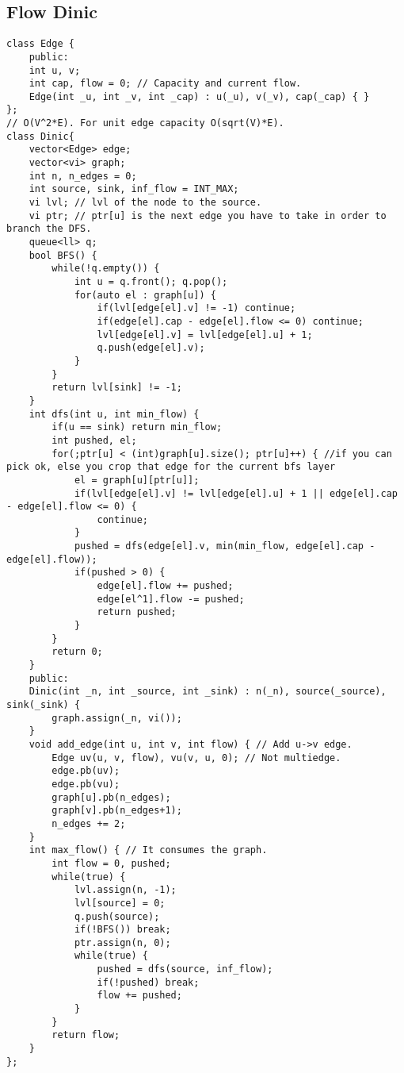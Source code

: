 \documentclass[a4paper]{article}
\begin{document}
\subsection*{Flow Dinic}
\begin{verbatim}
class Edge {
    public:
    int u, v;
    int cap, flow = 0; // Capacity and current flow.
    Edge(int _u, int _v, int _cap) : u(_u), v(_v), cap(_cap) { }
};
// O(V^2*E). For unit edge capacity O(sqrt(V)*E).
class Dinic{
    vector<Edge> edge;
    vector<vi> graph;
    int n, n_edges = 0;
    int source, sink, inf_flow = INT_MAX;
    vi lvl; // lvl of the node to the source.
    vi ptr; // ptr[u] is the next edge you have to take in order to branch the DFS.
    queue<ll> q;
    bool BFS() {
        while(!q.empty()) {
            int u = q.front(); q.pop();
            for(auto el : graph[u]) {
                if(lvl[edge[el].v] != -1) continue;
                if(edge[el].cap - edge[el].flow <= 0) continue;
                lvl[edge[el].v] = lvl[edge[el].u] + 1;
                q.push(edge[el].v);
            }
        }
        return lvl[sink] != -1;
    }
    int dfs(int u, int min_flow) {
        if(u == sink) return min_flow;
        int pushed, el;
        for(;ptr[u] < (int)graph[u].size(); ptr[u]++) { //if you can pick ok, else you crop that edge for the current bfs layer
            el = graph[u][ptr[u]];
            if(lvl[edge[el].v] != lvl[edge[el].u] + 1 || edge[el].cap - edge[el].flow <= 0) {
                continue;
            }
            pushed = dfs(edge[el].v, min(min_flow, edge[el].cap - edge[el].flow));
            if(pushed > 0) {
                edge[el].flow += pushed;
                edge[el^1].flow -= pushed;
                return pushed;
            }
        }
        return 0;
    }
    public:
    Dinic(int _n, int _source, int _sink) : n(_n), source(_source), sink(_sink) {
        graph.assign(_n, vi());
    }
    void add_edge(int u, int v, int flow) { // Add u->v edge.
        Edge uv(u, v, flow), vu(v, u, 0); // Not multiedge.
        edge.pb(uv);
        edge.pb(vu);
        graph[u].pb(n_edges);
        graph[v].pb(n_edges+1);
        n_edges += 2;
    }
    int max_flow() { // It consumes the graph.
        int flow = 0, pushed;
        while(true) {
            lvl.assign(n, -1);
            lvl[source] = 0;
            q.push(source);
            if(!BFS()) break;
            ptr.assign(n, 0);
            while(true) {
                pushed = dfs(source, inf_flow);
                if(!pushed) break;
                flow += pushed;
            }
        }
        return flow;
    }
};
\end{verbatim}
\end{document}
